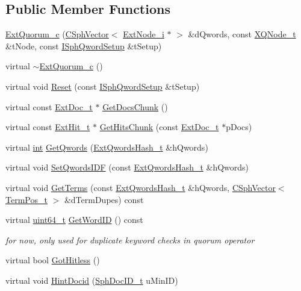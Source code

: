 \subsection*{Public Member Functions}
\begin{DoxyCompactItemize}
\item 
\hyperlink{classExtQuorum__c_a21c0732eb8861e167a447e0bea049136}{Ext\-Quorum\-\_\-c} (\hyperlink{classCSphVector}{C\-Sph\-Vector}$<$ \hyperlink{classExtNode__i}{Ext\-Node\-\_\-i} $\ast$ $>$ \&d\-Qwords, const \hyperlink{structXQNode__t}{X\-Q\-Node\-\_\-t} \&t\-Node, const \hyperlink{classISphQwordSetup}{I\-Sph\-Qword\-Setup} \&t\-Setup)
\item 
virtual \hyperlink{classExtQuorum__c_a92090421306ae29239cf98f003e256d2}{$\sim$\-Ext\-Quorum\-\_\-c} ()
\item 
virtual void \hyperlink{classExtQuorum__c_a8e52d583f3ae86095c2e410d24e77514}{Reset} (const \hyperlink{classISphQwordSetup}{I\-Sph\-Qword\-Setup} \&t\-Setup)
\item 
virtual const \hyperlink{structExtDoc__t}{Ext\-Doc\-\_\-t} $\ast$ \hyperlink{classExtQuorum__c_a92b13d5111d8efb3774f58371329d568}{Get\-Docs\-Chunk} ()
\item 
virtual const \hyperlink{structExtHit__t}{Ext\-Hit\-\_\-t} $\ast$ \hyperlink{classExtQuorum__c_aeece97cc40fcba55e56a0c7e5182a470}{Get\-Hits\-Chunk} (const \hyperlink{structExtDoc__t}{Ext\-Doc\-\_\-t} $\ast$p\-Docs)
\item 
virtual \hyperlink{sphinxexpr_8cpp_a4a26e8f9cb8b736e0c4cbf4d16de985e}{int} \hyperlink{classExtQuorum__c_ab2131bda8679d4eea2549f379aedaeee}{Get\-Qwords} (\hyperlink{sphinxsearch_8cpp_a814fc096e1ffb29d072d79b72b702fe6}{Ext\-Qwords\-Hash\-\_\-t} \&h\-Qwords)
\item 
virtual void \hyperlink{classExtQuorum__c_a78cf0e498c46fe1b27c2ad521904f08b}{Set\-Qwords\-I\-D\-F} (const \hyperlink{sphinxsearch_8cpp_a814fc096e1ffb29d072d79b72b702fe6}{Ext\-Qwords\-Hash\-\_\-t} \&h\-Qwords)
\item 
virtual void \hyperlink{classExtQuorum__c_a6098eecf86b064e1a0a0f6daf0006c2f}{Get\-Terms} (const \hyperlink{sphinxsearch_8cpp_a814fc096e1ffb29d072d79b72b702fe6}{Ext\-Qwords\-Hash\-\_\-t} \&h\-Qwords, \hyperlink{classCSphVector}{C\-Sph\-Vector}$<$ \hyperlink{structTermPos__t}{Term\-Pos\-\_\-t} $>$ \&d\-Term\-Dupes) const 
\item 
virtual \hyperlink{sphinxstd_8h_aaa5d1cd013383c889537491c3cfd9aad}{uint64\-\_\-t} \hyperlink{classExtQuorum__c_a4c0c79255459146332ed4112e63d9b7a}{Get\-Word\-I\-D} () const 
\begin{DoxyCompactList}\small\item\em for now, only used for duplicate keyword checks in quorum operator \end{DoxyCompactList}\item 
virtual bool \hyperlink{classExtQuorum__c_ae7128056c2e7fc87703fd9bcd7d1ca7b}{Got\-Hitless} ()
\item 
virtual void \hyperlink{classExtQuorum__c_a4de2644095647afa8df96bb005f57662}{Hint\-Docid} (\hyperlink{sphinx_8h_a3176771631c12a9e4897272003e6b447}{Sph\-Doc\-I\-D\-\_\-t} u\-Min\-I\-D)
\end{DoxyCompactItemize}
